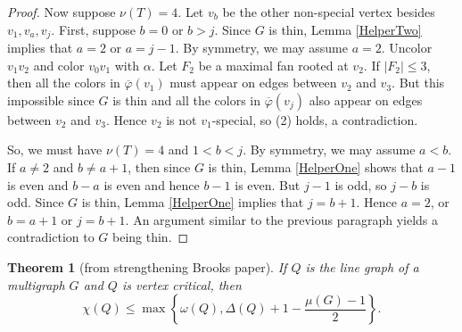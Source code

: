 \documentclass[12pt]{amsart}
\theoremstyle{plain}
\newtheorem{thm}{Theorem}
\theoremstyle{definition}
\theoremstyle{remark}
\newcommand{\vphn}{\overline{\varphi}}
\begin{document}
\begin{proof}
Now suppose $\nu(T) = 4$.  Let $v_b$ be the other non-special vertex besides $v_1, v_a, v_j$.  First, suppose $b = 0$ or $b > j$.  Since $G$ is thin, Lemma \ref{HelperTwo} implies that $a = 2$ or $a = j-1$.  
By symmetry, we may assume $a=2$.  Uncolor $v_1v_2$ and color $v_0v_1$ with $\alpha$.  Let $F_2$ be a maximal fan rooted at $v_2$.  If $|F_2| \le 3$, then all the colors in $\vphn(v_1)$ 
must appear on edges between $v_2$ and $v_3$.  But this impossible since $G$ is thin and all the colors in $\vphn(v_j)$ also appear on edges between $v_2$ and $v_3$.  
Hence $v_2$ is not $v_1$-special, so (2) holds, a contradiction.

So, we must have $\nu(T) = 4$ and $1 < b < j$.  By symmetry, we may assume $a < b$.  
If $a \ne 2$ and $b \ne a + 1$, then since $G$ is thin, Lemma \ref{HelperOne} shows that $a-1$ is even and $b-a$ is even and hence $b-1$ is even.  But $j-1$ is odd, so $j-b$ is odd.  
Since $G$ is thin, Lemma \ref{HelperOne} implies that $j = b+1$.  Hence $a =2$, or $b = a+1$ or $j = b+1$.  An argument similar to the previous paragraph yields a contradiction to $G$ being thin.
\end{proof}

\begin{thm}[from strengthening Brooks paper]\label{CriticalMuBound}
If $Q$ is the line graph of a multigraph $G$ and $Q$ is vertex critical, then
\[\chi(Q) \leq \max\left\{\omega(Q), \Delta(Q) + 1 - \frac{\mu(G) - 1}{2}\right\}.\]
\end{thm}
\end{document}
